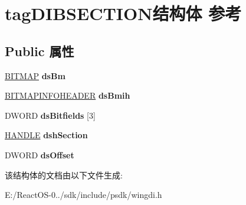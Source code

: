 \hypertarget{structtag_d_i_b_s_e_c_t_i_o_n}{}\section{tag\+D\+I\+B\+S\+E\+C\+T\+I\+O\+N结构体 参考}
\label{structtag_d_i_b_s_e_c_t_i_o_n}
\subsection*{Public 属性}
\begin{DoxyCompactItemize}
\item 
\mbox{\label{structtag_d_i_b_s_e_c_t_i_o_n_a484db8f0c1b2de1e69fac05b1adb0855}} 
\hyperlink{struct___b_i_t_m_a_p}{B\+I\+T\+M\+AP} {\bfseries ds\+Bm}
\item 
\mbox{\label{structtag_d_i_b_s_e_c_t_i_o_n_a6bf20572a3a212ddc7b68dda6654b97e}} 
\hyperlink{struct_b_i_t_m_a_p_i_n_f_o_h_e_a_d_e_r}{B\+I\+T\+M\+A\+P\+I\+N\+F\+O\+H\+E\+A\+D\+ER} {\bfseries ds\+Bmih}
\item 
\mbox{\label{structtag_d_i_b_s_e_c_t_i_o_n_a10187e406069d481f567761364809ff2}} 
D\+W\+O\+RD {\bfseries ds\+Bitfields} \mbox{[}3\mbox{]}
\item 
\mbox{\label{structtag_d_i_b_s_e_c_t_i_o_n_a2e76606db6e679b12304778639392d4f}} 
\hyperlink{interfacevoid}{H\+A\+N\+D\+LE} {\bfseries dsh\+Section}
\item 
\mbox{\label{structtag_d_i_b_s_e_c_t_i_o_n_a21255a694d1ecb9af05aca8a9632fd2d}} 
D\+W\+O\+RD {\bfseries ds\+Offset}
\end{DoxyCompactItemize}


该结构体的文档由以下文件生成\+:\begin{DoxyCompactItemize}
\item 
E\+:/\+React\+O\+S-\/0../sdk/include/psdk/wingdi.\+h\end{DoxyCompactItemize}
